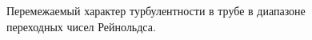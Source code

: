 \begin{figure}[h]
\caption{Перемежаемый характер турбулентности в трубе в диапазоне переходных чисел Рейнольдса.}
\label{puffs_img}
\end{figure}


\begin{comment}
Задача решается конечно-разностным методом, наиболее полно описанным в \cite{Nikitin2006}. Все величины представляются в безразмерном виде. В качестве единиц измерения выступают радиус трубы $R$, максимальная скорость течения Пуазейля (удвоенная средняя скорость течения) $U$, плотность жидкость $\rho$ и кинематический коэффициент вязкости $\nu$. Численный метод формулируется относительно уравнения движения \eqref{NS_eq}, преобразованного к виду:
\begin{equation}\label{NSom_eq}
\pd{\v}{t} =  \v \times \om  - \grad \Pi - \frac{1}{\Re} \rot \om,
\end{equation}
где $\om = \rot \v$ --- вектор завихренности, $\Pi = p/\rho + \v^2/2$. Эквивалентность уравнений \eqref{NS_eq} и \eqref{NSom_eq} следует из несжимаемости жидкости и векторных тождеств:
\begin{equation*}
-(\v \cdot \nabla) \v = \v \times \rot \v - \grad \frac{\v^2}{2},
\end{equation*}
\begin{equation*}
\nabla^2 \v = \nabla (\nabla \cdot \v) - \rot \rot \v.
\end{equation*}


\end{comment}
